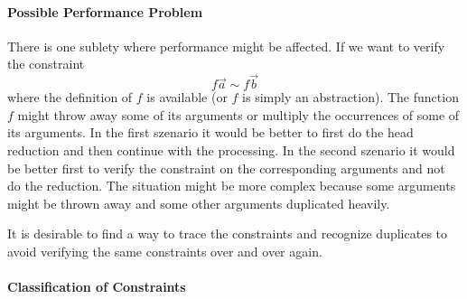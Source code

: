 \paragraph{Possible Performance Problem}
There is one sublety where performance might be affected. If we want to verify
the constraint
$$
    f \vec a \sim f \vec b
$$
where the definition of $f$ is available (or $f$ is simply an abstraction). The
function $f$ might throw away some of its arguments or multiply the occurrences
of some of its arguments. In the first szenario it would be better to first do
the head reduction and then continue with the processing. In the second szenario
it would be better first to verify the constraint on the corresponding arguments
and not do the reduction. The situation might be more complex because some
arguments might be thrown away and some other arguments duplicated heavily.

It is desirable to find a way to trace the constraints and recognize duplicates
to avoid verifying the same constraints over and over again.






\paragraph{Classification of Constraints}

